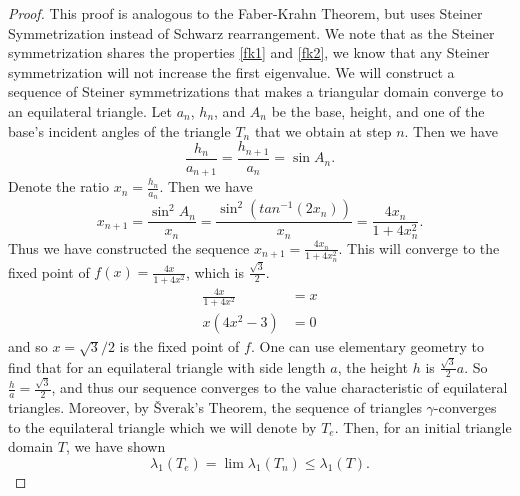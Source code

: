 \begin{proof}
  This proof is analogous to the Faber-Krahn Theorem, but uses Steiner Symmetrization instead of Schwarz rearrangement.
  We note that as the Steiner symmetrization shares the properties \ref{fk1} and \ref{fk2}, we know that any Steiner symmetrization will not increase the first eigenvalue.
  We will construct a sequence of Steiner symmetrizations that makes a triangular domain converge to an equilateral triangle.
  Let $a_{n}$, $h_{n}$, and $A_{n}$ be the base, height, and one of the base's incident angles of the triangle $T_{n}$ that we obtain at step $n$.
  Then we have 
  \[
  \frac{h_{n}}{a_{n+1}} = \frac{h_{n+1}}{a_{n}} = \sin A_{n}
  .\] 
  Denote the ratio $x_{n} = \frac{h_{n}}{a_{n}}$.
  Then we have
  \[
  x_{n+1} = \frac{\sin^2 A_{n}}{x_{n}} = \frac{\sin^2(tan^{-1}(2x_{n}))}{x_{n}} = \frac{4x_{n}}{1 + 4x_{n}^2}
  .\] 
  Thus we have constructed the sequence $x_{n+1} = \frac{4x_{n}}{1 + 4x_{n}^2}$.
  This will converge to the fixed point of $f(x) = \frac{4x}{1 + 4x^2}$, which is $\frac{\sqrt{3}}{2}$.
  \begin{align*}
    \frac{4x}{1 + 4x^2} &= x \\
    x \left( 4x^2 - 3 \right ) &= 0
  \end{align*}
  and so $x = \sqrt{3} / {2}$ is the fixed point of $f$.
  One can use elementary geometry to find that for an equilateral triangle with side length $a$, the height $h$ is  $\frac{\sqrt{3}}{2} a$.
  So $\frac{h}{a} = \frac{\sqrt{3}}{2}$, and thus our sequence converges to the value characteristic of equilateral triangles.
  Moreover, by Šverak's Theorem, the sequence of triangles $\gamma$-converges to the equilateral triangle which we will denote by $T_{e}$.
  Then, for an initial triangle domain $T$, we have shown 
  \[
  \lambda_{1}(T_{e}) = \lim \lambda_{1}(T_{n}) \leq \lambda_{1}(T)
  .\] 


\end{proof}

